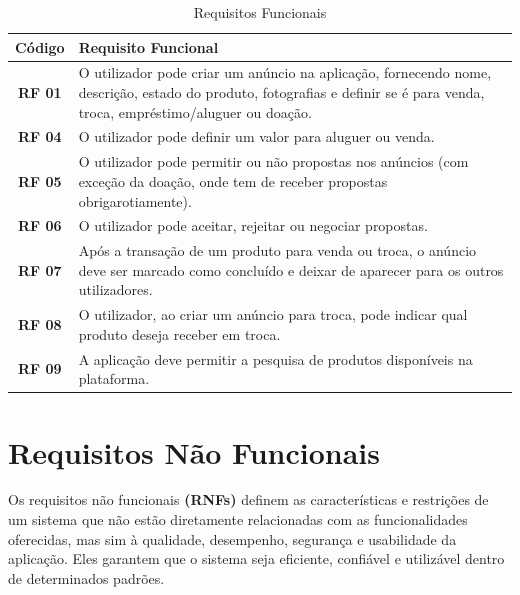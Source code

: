 \documentclass[a4paper, 12pt]{article} %
\begin{document}
\begin{table}[H]
	\centering
	\renewcommand{\arraystretch}{1.3}
	\begin{tabular}{|c|p{12cm}|}
		\hline
		\textbf{Código} & \textbf{Requisito Funcional} \\
		\hline
		\textbf{RF 01} & O utilizador pode criar um anúncio na aplicação, fornecendo nome, descrição, estado do produto, fotografias e definir se é para venda, troca, empréstimo/aluguer ou doação. \\
		\hline
		\textbf{RF 04} & O utilizador pode definir um valor para aluguer ou venda. \\
		\hline
		\textbf{RF 05} & O utilizador pode permitir ou não propostas nos anúncios (com exceção da doação, onde tem de receber propostas obrigarotiamente). \\
		\hline
		\textbf{RF 06} & O utilizador pode aceitar, rejeitar ou negociar propostas. \\
		\hline
		\textbf{RF 07} & Após a transação de um produto para venda ou troca, o anúncio deve ser marcado como concluído e deixar de aparecer para os outros utilizadores. \\
		\hline
		\textbf{RF 08} & O utilizador, ao criar um anúncio para troca, pode indicar qual produto deseja receber em troca. \\
		\hline
		\textbf{RF 09} & A aplicação deve permitir a pesquisa de produtos disponíveis na plataforma. \\
		\hline
	\end{tabular}
	\caption{Requisitos Funcionais}
	\label{tab:requisitos_funcionais}
\end{table}


\newpage
\section{Requisitos Não Funcionais}

Os requisitos não funcionais \textbf{(RNFs)} definem as características e restrições de um sistema que não estão diretamente relacionadas com as funcionalidades oferecidas, mas sim à qualidade, desempenho, segurança e usabilidade da aplicação. Eles garantem que o sistema seja eficiente, confiável e utilizável dentro de determinados padrões.
\end{document}
